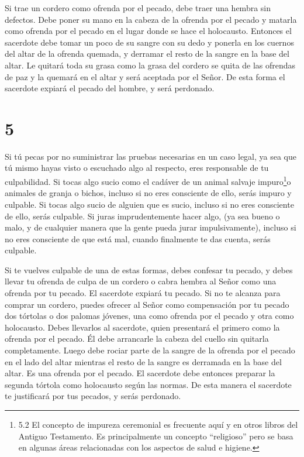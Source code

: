  Si trae un cordero como ofrenda por el pecado, debe traer
una hembra sin defectos.  Debe poner su mano en la cabeza
de la ofrenda por el pecado y matarla como ofrenda por el pecado en el
lugar donde se hace el holocausto.  Entonces el sacerdote
debe tomar un poco de su sangre con su dedo y ponerla en los cuernos del
altar de la ofrenda quemada, y derramar el resto de la sangre en la base
del altar.  Le quitará toda su grasa como la grasa del
cordero se quita de las ofrendas de paz y la quemará en el altar y será
aceptada por el Señor. De esta forma el sacerdote expiará el pecado del
hombre, y será perdonado.

\hypertarget{section-4}{%
\section{5}\label{section-4}}

 Si tú pecas por no suministrar las pruebas necesarias en un
caso legal, ya sea que tú mismo hayas visto o escuchado algo al
respecto, eres responsable de tu culpabilidad.  Si tocas
algo sucio como el cadáver de un animal salvaje impuro\footnote{5.2 El
  concepto de impureza ceremonial es frecuente aquí y en otros libros
  del Antiguo Testamento. Es principalmente un concepto ``religioso''
  pero se basa en algunas áreas relacionadas con los aspectos de salud e
  higiene.}o animales de granja o bichos, incluso si no eres consciente
de ello, serás impuro y culpable.  Si tocas algo sucio de
alguien que es sucio, incluso si no eres consciente de ello, serás
culpable.  Si juras imprudentemente hacer algo, (ya sea
bueno o malo, y de cualquier manera que la gente pueda jurar
impulsivamente), incluso si no eres consciente de que está mal, cuando
finalmente te das cuenta, serás culpable.

 Si te vuelves culpable de una de estas formas, debes
confesar tu pecado,  y debes llevar tu ofrenda de culpa de
un cordero o cabra hembra al Señor como una ofrenda por tu pecado. El
sacerdote expiará tu pecado.  Si no te alcanza para comprar
un cordero, puedes ofrecer al Señor como compensación por tu pecado dos
tórtolas o dos palomas jóvenes, una como ofrenda por el pecado y otra
como holocausto.  Debes llevarlos al sacerdote, quien
presentará el primero como la ofrenda por el pecado. Él debe arrancarle
la cabeza del cuello sin quitarla completamente.  Luego debe
rociar parte de la sangre de la ofrenda por el pecado en el lado del
altar mientras el resto de la sangre es derramada en la base del altar.
Es una ofrenda por el pecado.  El sacerdote debe entonces
preparar la segunda tórtola como holocausto según las normas. De esta
manera el sacerdote te justificará por tus pecados, y serás perdonado.

